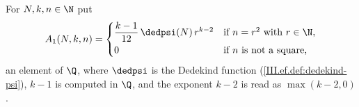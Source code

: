 For $N,k,n\in\N$ put
\[
  A_1(N,k,n)=\begin{cases}\dfrac{k-1}{12}\,\dedpsi(N)\,r^{k-2}&\text{if }n=r^2\text{ with }r\in\N,\\[1ex] 0&\text{if $n$ is not a square,}\end{cases}
\]
an element of $\Q$, where $\dedpsi$ is the Dedekind function (\cref{III.ef.def:dedekind-psi}), $k-1$ is computed in $\Q$, and the exponent $k-2$ is
read as $\max(k-2,0)$.
